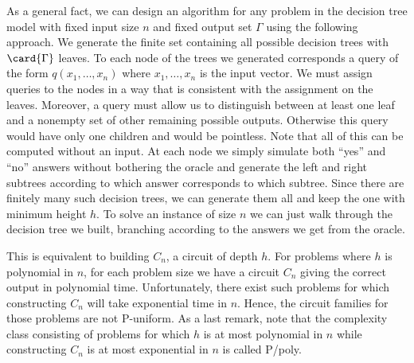 As a general fact, we can design an algorithm for any problem in the decision
tree model with fixed input size \(n\) and fixed output set \(\Gamma\) using
the following approach. We generate the finite set containing all possible
decision trees with \(\card{\Gamma}\) leaves. To each node of the trees we
generated corresponds a query of the form \(q(x_1,\ldots,x_n)\) where
\(x_1,\ldots,x_n\) is the input vector. We must assign queries to the nodes
in a way that is consistent with the assignment on the leaves. Moreover, a
query must allow us to distinguish between at least one leaf and a nonempty
set of other remaining possible outputs. Otherwise this query would have only
one children and would be pointless. Note that all of this can be computed
without an input. At each node we simply simulate both ``yes'' and ``no''
answers without bothering the oracle and generate the left and right subtrees
according to which answer corresponds to which subtree. Since there are
finitely many such decision trees, we can generate them all and keep the one
with minimum height \(h\). To solve an instance of size \(n\) we can just walk
through the decision tree we built, branching according to the answers we get
from the oracle.

This is equivalent to building \(C_n\), a circuit of depth \(h\). For problems
where \(h\) is polynomial in \(n\), for each problem size we have a circuit
\(C_n\) giving the correct output in polynomial time. Unfortunately, there
exist such problems for which constructing \(C_n\) will take exponential time
in \(n\). Hence, the circuit families for those problems are not P-uniform. As
a last remark, note that the complexity class consisting of problems for which
\(h\) is at most polynomial in \(n\) while constructing \(C_n\) is at most
exponential in \(n\) is called P/poly.

